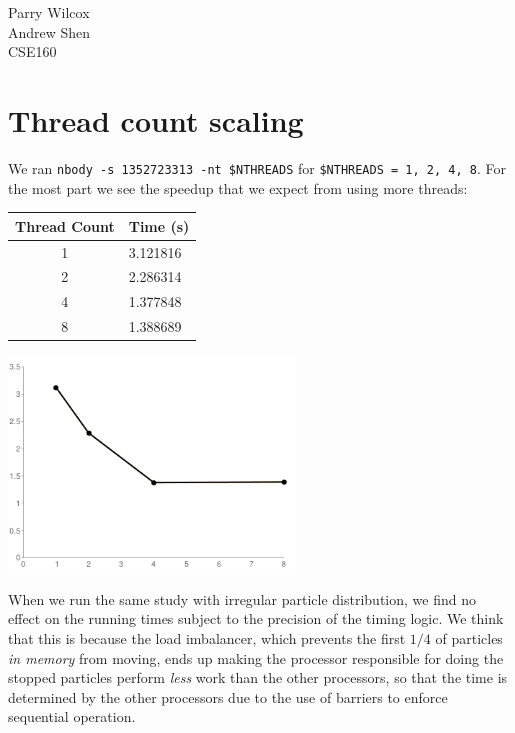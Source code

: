 \documentclass{article}[12pt;letterpaper]
\begin{document}
\begin{flushleft}
Parry Wilcox \\
Andrew Shen \\
CSE160
\end{flushleft}

\section{Thread count scaling}

We ran \texttt{nbody -s 1352723313 -nt \$NTHREADS} for \texttt{\$NTHREADS = 1,
2, 4, 8}. For the most part we see the speedup that we expect from using more
threads:

\begin{center}\begin{tabular}{c l}
Thread Count & Time (s) \\
\hline{}
1 & 3.121816 \\
2 & 2.286314 \\
4 & 1.377848 \\
8 & 1.388689
\end{tabular}

\includegraphics[width=3in]{a2_sec1_1.png}
\end{center}

When we run the same study with irregular particle distribution, we find no
effect on the running times subject to the precision of the timing logic. We
think that this is because the load imbalancer, which prevents the first $1/4$
of particles \textit{in memory} from moving, ends up making the processor
responsible for doing the stopped particles perform \textit{less} work than
the other processors, so that the time is determined by the other processors
due to the use of barriers to enforce sequential operation.
\end{document}
